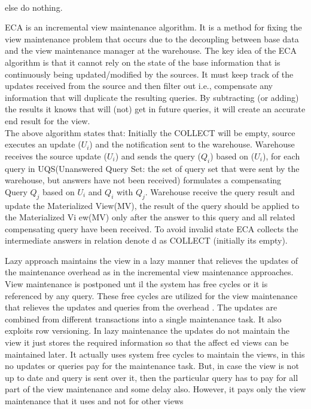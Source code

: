 \documentclass[12pt]{report}
\begin{document}
\begin{description}[font=$\bullet$~\normalfont\scshape\color{blue!50!black}]
\begin{center}
\\        else do nothing. 
\end{center}
ECA is an incremental view maintenance algorithm. It is a 
method   for   fixing   the   view   maintenance   problem   that   
occurs  due  to  the  decoupling  between  base  data  and  the  
view maintenance manager at the warehouse. The key idea 
of  the  ECA  algorithm  is  that  it  cannot  rely  on  the  state  of  
the     base     information     that     is     continuously     being     
updated/modified  by  the  sources.  It  must  keep  track  of  the  
updates  received  from  the  source  and  then  filter  out  i.e.,  
compensate any information that will duplicate the resulting 
queries. By subtracting (or adding) the results it knows that 
will (not) get in future queries, it will create an accurate end 
result for the view.
\\The above algorithm states that: 
Initially  the  COLLECT  will  be  empty,  source  executes  an  
update  ($U_i$)  and  the  notification  sent  to  the  warehouse.  
Warehouse  receives  the  source  update ($U_i$)  and  sends  the  
query ($Q_i$)     based on  ($U_i$), for each query in     
UQS(Unanswered Query Set: the set of query set that were 
sent by the warehouse, but answers have not been received)
formulates  a  compensating  Query $Q_j$ based on $U_i$ and $Q_i$ with $Q_j$. Warehouse receive the query result and update the 
Materialized  View(MV),  the  result  of  the  query  should  be  
applied to the Materialized Vi
ew(MV) only after the answer 
to this query and all related compensating query have been 
received. 
To   avoid   invalid   state   ECA   collects   the   intermediate   
answers  in  relation  denote
d  as  COLLECT  (initially  its  
empty).\cite{saudi}
\item[Lazy Approach] Lazy approach maintains the view in a lazy manner that 
relieves the updates of the maintenance overhead as in the 
incremental view maintenance approaches. View 
maintenance is postponed unt
il the system has free cycles 
or it is referenced by any query. These free cycles are utilized for the view maintenance that relieves the updates 
and queries from the overhead
. The updates are combined 
from different transactions into a single maintenance task. It 
also exploits row versioning. In lazy maintenance the 
updates do not maintain the view it just stores the required 
information so that the affect
ed views can be maintained 
later. It actually uses system free cycles to maintain the 
views, in this no updates or queries pay for the maintenance 
task. But, in case the view is not
 up to date and query is sent 
over it, then the particular query has to pay for all part of 
the view maintenance and some
delay also. However, it 
pays only the view maintenance that it uses and not for 
other views \cite{basic}
\end{description}
\end{document}
